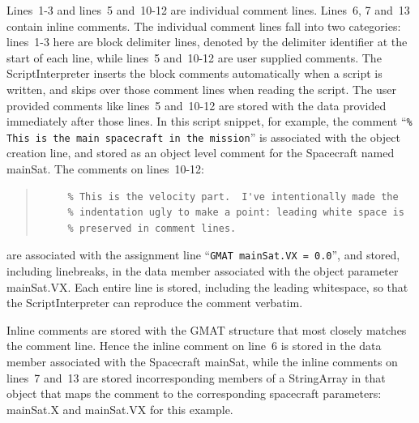 \noindent Lines~1-3 and lines~5 and~10-12 are individual comment lines.  Lines~6, 7 and~13 contain
inline comments.  The individual comment lines fall into two categories: lines~1-3 here are block
delimiter lines, denoted by the delimiter identifier at the start of each line, while lines~5
and~10-12 are user supplied comments.  The ScriptInterpreter inserts the block comments
automatically when a script is written, and skips over those comment lines when reading the script.
The user provided comments like lines~5 and~10-12 are stored with the data provided immediately
after those lines.  In this script snippet, for example, the comment ``\texttt{\% This is the main
spacecraft in the mission}'' is associated with the object creation line, and stored as an object
level comment for the Spacecraft named mainSat.  The comments on lines~10-12:

\begin{quote}
\linenumbers[10]
\begin{verbatim}
     % This is the velocity part.  I've intentionally made the
     % indentation ugly to make a point: leading white space is
     % preserved in comment lines.
\end{verbatim}
\end{quote}

\noindent are associated with the assignment line ``\texttt{GMAT mainSat.VX = 0.0}'', and
stored, including linebreaks, in the data member associated with the object parameter mainSat.VX.
Each entire line is stored, including the leading whitespace, so that the ScriptInterpreter can
reproduce the comment verbatim.

Inline comments are stored with the GMAT structure that most closely matches the comment line.
Hence the inline comment on line~6 is stored in the data member associated with the Spacecraft
mainSat, while the inline comments on lines~7 and~13 are stored incorresponding members of a
StringArray in that object that maps the comment to the corresponding spacecraft parameters:
mainSat.X and mainSat.VX for this example.

